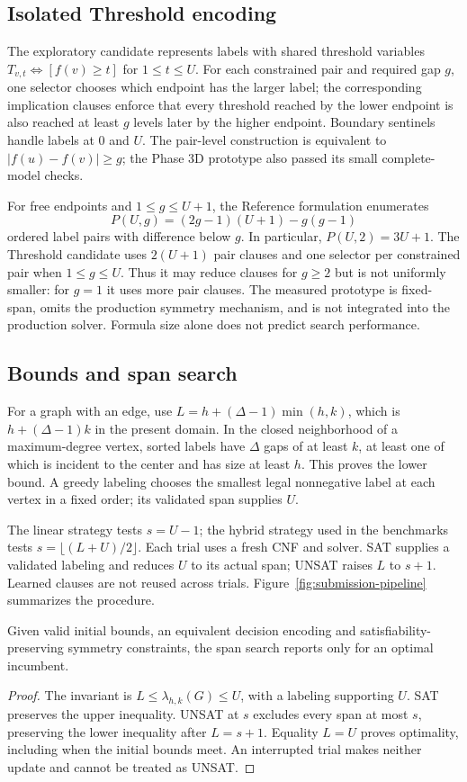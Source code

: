 \subsection{Isolated Threshold encoding}
\label{sec:threshold-method}
The exploratory candidate represents labels with shared threshold
variables $T_{v,t}\Leftrightarrow[f(v)\geq t]$ for $1\leq t\leq U$.
For each constrained pair and required gap $g$, one selector chooses
which endpoint has the larger label; the corresponding implication
clauses enforce that every threshold reached by the lower endpoint is
also reached at least $g$ levels later by the higher endpoint. Boundary
sentinels handle labels at 0 and $U$. The pair-level construction is
equivalent to $|f(u)-f(v)|\geq g$; the Phase 3D prototype also passed its
small complete-model checks.

For free endpoints and $1\leq g\leq U+1$, the Reference formulation
enumerates
\[
 P(U,g)=(2g-1)(U+1)-g(g-1)
\]
ordered label pairs with difference below $g$. In particular,
$P(U,2)=3U+1$. The Threshold candidate uses $2(U+1)$ pair clauses and
one selector per constrained pair when $1\leq g\leq U$. Thus it may
reduce clauses for $g\geq2$ but is not uniformly smaller: for $g=1$ it
uses more pair clauses. The measured prototype is fixed-span, omits the
production symmetry mechanism, and is not integrated into the production
solver. Formula size alone does not predict search performance.


\subsection{Bounds and span search}
For a graph with an edge, use $L=h+(\Delta-1)\min(h,k)$,
which is $h+(\Delta-1)k$ in the present domain. In the closed
neighborhood of a maximum-degree vertex, sorted labels have $\Delta$
gaps of at least $k$, at least one of which is incident to the center
and has size at least $h$. This proves the lower bound. A greedy labeling
chooses the smallest legal nonnegative label at each vertex in a fixed
order; its validated span supplies $U$.

The linear strategy tests $s=U-1$; the hybrid strategy used in the
benchmarks tests $s=\lfloor(L+U)/2\rfloor$. Each trial uses a fresh CNF
and solver. SAT supplies a validated labeling and reduces $U$ to its
actual span; UNSAT raises $L$ to $s+1$. Learned clauses are not reused
across trials. Figure~\ref{fig:submission-pipeline} summarizes the procedure.

\begin{proposition}\label{prop:submission-search}
Given valid initial bounds, an equivalent decision encoding and
satisfiability-preserving symmetry constraints, the span search reports
\OPT{} only for an optimal incumbent.
\end{proposition}
\begin{proof}
The invariant is $L\leq\lambda_{h,k}(G)\leq U$, with a labeling supporting
$U$. SAT preserves the upper inequality. UNSAT at $s$ excludes every
span at most $s$, preserving the lower inequality after $L=s+1$.
Equality $L=U$ proves optimality, including when the initial bounds meet.
An interrupted trial makes neither update and cannot be treated as UNSAT.
\end{proof}

